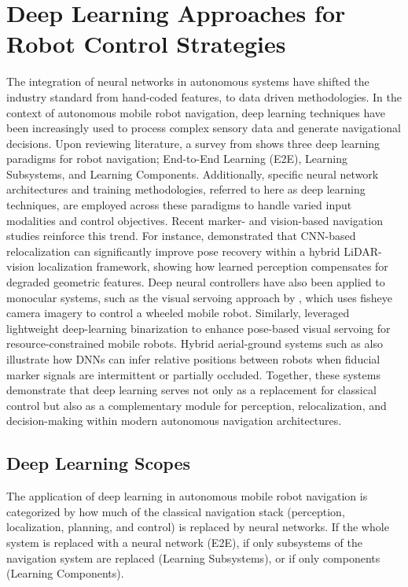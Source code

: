 \section{Deep Learning Approaches for Robot Control Strategies}
The integration of neural networks in autonomous systems have shifted the industry standard from hand-coded features, to data driven methodologies. In the context of autonomous mobile robot navigation, deep learning techniques have been increasingly used to process complex sensory data and generate navigational decisions. Upon reviewing literature, a survey from \cite{Xiao2022MLMotionPlanningSurvey} shows three deep learning paradigms for robot navigation; End-to-End Learning (E2E), Learning Subsystems, and Learning Components. Additionally, specific neural network architectures and training methodologies, referred to here as deep learning techniques, are employed across these paradigms to handle varied input modalities and control objectives. Recent marker- and vision-based navigation studies reinforce this trend. For instance, \cite{Liu2022RobustLocalizationVisionCNN} demonstrated that CNN-based relocalization can significantly improve pose recovery within a hybrid LiDAR-vision localization framework, showing how learned perception compensates for degraded geometric features. Deep neural controllers have also been applied to monocular systems, such as the visual servoing approach by \cite{Jokic2019NNVisualServoing}, which uses fisheye camera imagery to control a wheeled mobile robot. Similarly, \cite{Ho2020PoseVisualServoing} leveraged lightweight deep-learning binarization to enhance pose-based visual servoing for resource-constrained mobile robots. Hybrid aerial-ground systems such as \cite{Asif2020TetheredDroneLocalization} also illustrate how DNNs can infer relative positions between robots when fiducial marker signals are intermittent or partially occluded.
Together, these systems demonstrate that deep learning serves not only as a replacement for classical control but also as a complementary module for perception, relocalization, and decision-making within modern autonomous navigation architectures.

\subsection{Deep Learning Scopes}
The application of deep learning in autonomous mobile robot navigation is categorized by how much of the classical navigation stack (perception, localization, planning, and control) is replaced by neural networks. If the whole system is replaced with a neural network (E2E), if only subsystems of the navigation system are replaced (Learning Subsystems), or if only components (Learning Components).

